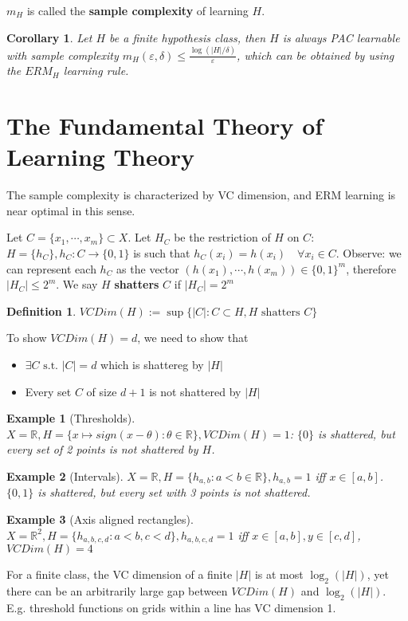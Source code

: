 \documentclass{book}
\newcommand{\R}{\mathbb{R}}
\newcommand{\st}{\text{ s.t. }}
\newtheorem{Cor}[Thm]{Corollary}
\newtheorem{Def}{Definition}[section]
\newtheorem{Eg}{Example}[section]
\begin{document}
$m_{H}$ is called the \textbf{sample complexity} of learning $H$.
\begin{Cor}
  Let $H$ be a finite hypothesis class, then $H$ is always PAC learnable with sample complexity $m_{H}(\varepsilon,\delta)\leq\frac{\log(|H|/\delta)}{\varepsilon}$, which can be obtained by using the $ERM_{H}$ learning rule.
\end{Cor}

\section{The Fundamental Theory of Learning Theory}

The sample complexity is characterized by VC dimension, and ERM learning is near optimal in this sense.

Let $C=\{x_{1},\cdots,x_{m}\}\subset X$. Let $H_{C}$ be the restriction of $H$ on $C$: $H=\{h_{C}\}, h_{C}:C\to \{0,1\}$ is such that $h_{C}(x_{i})=h(x_{i})\quad \forall x_{i}\in C$. Observe: we can represent each $h_{C}$ as the vector $(h(x_{1}),\cdots,h(x_{m}))\in \{0,1\}^{m}$, therefore $|H_{C}|\leq 2^{m}$. We say $H$ \textbf{shatters} $C$ if $|H_{C}|=2^{m}$

\begin{Def}
  $VCDim(H):=\sup\{|C|:C\subset H, H\text{ shatters }C\}$
\end{Def}

To show $VCDim(H)=d$, we need to show that
\begin{itemize}
\item $\exists C\st |C|=d$ which is shattereg by $|H|$
\item Every set $C$ of size $d+1$ is not shattered by $|H|$
\end{itemize}

\begin{Eg}[Thresholds]
   $X=\R, H=\{x\mapsto sign(x-\theta):\theta\in\R\}, VCDim(H)=1$: $\{0\}$ is shattered, but every set of 2 points is not shattered by $H$.  
\end{Eg}

\begin{Eg}[Intervals]
  $X=\R, H=\{h_{a,b}:a<b\in\R\}, h_{a,b}=1$ iff $x\in [a,b]$. $\{0,1\}$ is shattered, but every set with 3 points is not shattered.
  \end{Eg}

  \begin{Eg}[Axis aligned rectangles]
    $X=\R^{2},H=\{h_{a,b,c,d}: a<b,c<d\},h_{a,b,c,d}=1$ iff $x\in [a,b], y\in [c,d]$, $VCDim(H)=4$
  \end{Eg}
For a finite class, the VC dimension of a finite $|H|$ is at most $\log_{2}(|H|)$, yet there can be an arbitrarily large gap between $VCDim(H)$ and $\log_{2}(|H|)$. E.g. threshold functions on grids within a line has VC dimension 1.
\end{document}
